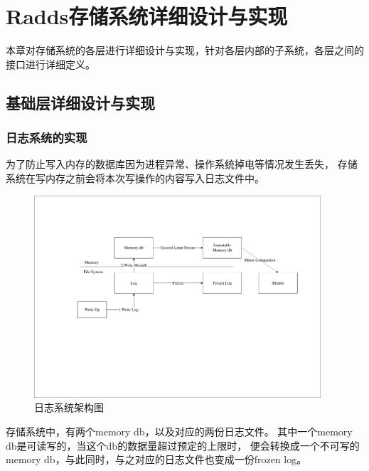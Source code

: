 \section{Radds存储系统详细设计与实现}

	本章对存储系统的各层进行详细设计与实现，针对各层内部的子系统，各层之间的接口进行详细定义。

	\subsection{基础层详细设计与实现}
	

	

 

	
			
   		\subsubsection{日志系统的实现}
    
	   	为了防止写入内存的数据库因为进程异常、操作系统掉电等情况发生丢失，
	   	存储系统在写内存之前会将本次写操作的内容写入日志文件中。
    
    	\begin{figure}[H]
    		\centering
    		\includegraphics[width=0.95\textwidth]{pdf/two_log.pdf}
    		\caption{日志系统架构图}
    		\label{two_log}
    	\end{figure}
		存储系统中，有两个memory db，以及对应的两份日志文件。
		其中一个memory db是可读写的，当这个db的数据量超过预定的上限时，
		便会转换成一个不可写的memory db，与此同时，与之对应的日志文件也变成一份frozen log。

